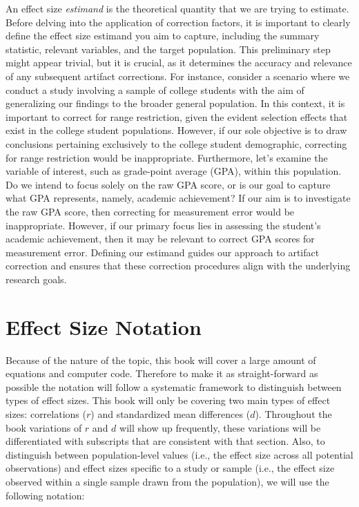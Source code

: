 \documentclass[
  letterpaper,
  DIV=11,
  numbers=noendperiod]{scrreprt}
\begin{document}
An effect size \emph{estimand} is the theoretical quantity that we are
trying to estimate. Before delving into the application of correction
factors, it is important to clearly define the effect size estimand you
aim to capture, including the summary statistic, relevant variables, and
the target population. This preliminary step might appear trivial, but
it is crucial, as it determines the accuracy and relevance of any
subsequent artifact corrections. For instance, consider a scenario where
we conduct a study involving a sample of college students with the aim
of generalizing our findings to the broader general population. In this
context, it is important to correct for range restriction, given the
evident selection effects that exist in the college student populations.
However, if our sole objective is to draw conclusions pertaining
exclusively to the college student demographic, correcting for range
restriction would be inappropriate. Furthermore, let's examine the
variable of interest, such as grade-point average (GPA), within this
population. Do we intend to focus solely on the raw GPA score, or is our
goal to capture what GPA represents, namely, academic achievement? If
our aim is to investigate the raw GPA score, then correcting for
measurement error would be inappropriate. However, if our primary focus
lies in assessing the student's academic achievement, then it may be
relevant to correct GPA scores for measurement error. Defining our
estimand guides our approach to artifact correction and ensures that
these correction procedures align with the underlying research goals.

\hypertarget{effect-size-notation}{%
\section{Effect Size Notation}\label{effect-size-notation}}

Because of the nature of the topic, this book will cover a large amount
of equations and computer code. Therefore to make it as straight-forward
as possible the notation will follow a systematic framework to
distinguish between types of effect sizes. This book will only be
covering two main types of effect sizes: correlations (\(r\)) and
standardized mean differences (\(d\)). Throughout the book variations of
\(r\) and \(d\) will show up frequently, these variations will be
differentiated with subscripts that are consistent with that section.
Also, to distinguish between population-level values (i.e., the effect
size across all potential observations) and effect sizes specific to a
study or sample (i.e., the effect size observed within a single sample
drawn from the population), we will use the following notation:
\end{document}
